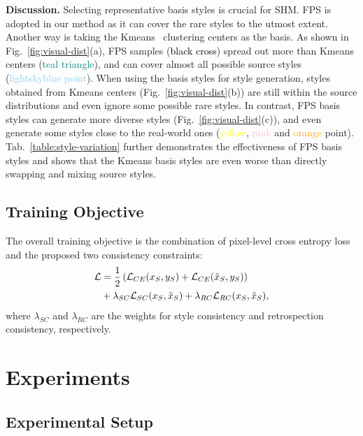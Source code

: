 \documentclass[runningheads]{llncs}
\begin{document}
\noindent\textbf{Discussion.}
Selecting representative basis styles is crucial for SHM. FPS is adopted in our method as it can cover the rare styles to the utmost extent. Another way is taking the Kmeans~\cite{macqueen1967some_kmeans} clustering centers as the basis. As shown in Fig.~\ref{fig:visual-dist}(a), FPS samples (\textcolor{black}{black cross}) spread out more than Kmeans centers (\textcolor{teal}{teal triangle}), and can cover almost all possible source styles (\textcolor{lightskyblue}{lightskyblue point}). When using the basis styles for style generation, styles obtained from Kmeans centers (Fig.~\ref{fig:visual-dist}(b)) are still within the source distributions and even ignore some possible rare styles. In contrast, FPS basis styles can generate more diverse styles (Fig.~\ref{fig:visual-dist}(c)), and even generate some styles close to the real-world ones (\textcolor{yellow}{yellow}, \textcolor{pink}{pink} and \textcolor{orange}{orange} point). Tab.~\ref{table:style-variation} further demonstrates the effectiveness of FPS basis styles and shows that the Kmeans basis styles are even worse than directly swapping and mixing source styles.


\subsection{Training Objective}
The overall training objective is the combination of pixel-level cross entropy loss and the proposed two consistency constraints:
\begin{equation}
\begin{aligned}
    \mathcal{L} &= \frac{1}{2} \left( \mathcal{L}_{CE}(x_S,y_S) + \mathcal{L}_{CE}(\Tilde{x}_S,y_S) \right) \\
    &+ \lambda_{SC} \mathcal{L}_{SC}(x_S, \Tilde{x}_S) + \lambda_{RC} \mathcal{L}_{RC}(x_S, \Tilde{x}_S),
\end{aligned}
\end{equation}
where $\lambda_{SC}$ and $\lambda_{RC}$ are the weights for style consistency and retrospection consistency, respectively.



\section{Experiments}

\subsection{Experimental Setup}
\label{sec:seg_imple_details}
\end{document}
